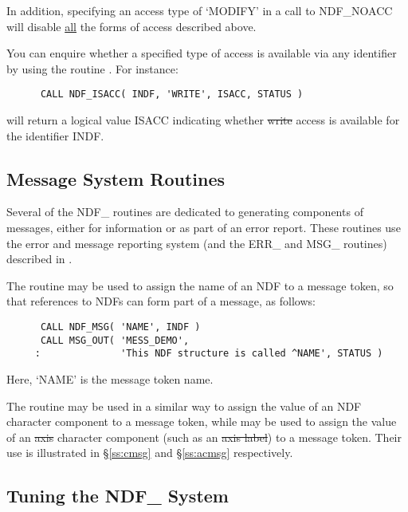 In addition, specifying an access type of `MODIFY' in a call to NDF\_NOACC 
will disable \underline{all} the forms of access described above.

You can enquire whether a specified type of access is available via any 
identifier by using the routine . 
For instance: 

\small
\begin{verbatim}
      CALL NDF_ISACC( INDF, 'WRITE', ISACC, STATUS )
\end{verbatim}
\normalsize

will return a logical value ISACC indicating whether \st{write\/} access is
available for the identifier INDF. 

\subsection{Message System Routines}

Several of the NDF\_ routines are dedicated to generating components
of messages, either for information or as part of an error report.
These routines use the error and message reporting system (and the
ERR\_ and MSG\_ routines) described in .

The routine  may be used to assign the name of an NDF to a message
token, so that references to NDFs can form part of a message, as follows: 

\small
\begin{verbatim}
      CALL NDF_MSG( 'NAME', INDF )
      CALL MSG_OUT( 'MESS_DEMO',
     :              'This NDF structure is called ^NAME', STATUS )
\end{verbatim}
\normalsize

Here, `NAME' is the message token name.

The routine  may be used in a similar way to assign the value of an
NDF character component to a message token, while  may be used to
assign the value of an \st{axis\/} character component (such as an
\st{axis label\/}) to a message token.  
Their use is illustrated in \S\ref{ss:cmsg} and \S\ref{ss:acmsg}
respectively. 

\subsection{\label{ss:tuning}Tuning the NDF\_ System}

